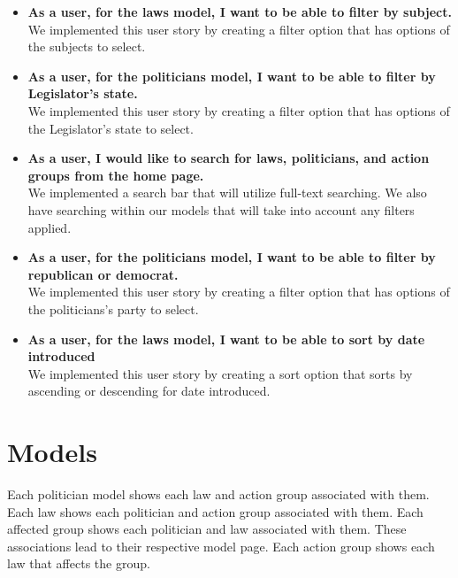 \documentclass[12pt]{article}
\begin{document}
\begin{itemize}
	\item\textbf{As a user, for the laws model, I want to be able to filter by subject.} \\
	We implemented this user story by creating a filter option that has options of the subjects to select.
	\\
	\item\textbf{As a user, for the politicians model, I want to be able to filter by Legislator's state.} \\
	We implemented this user story by creating a filter option that has options of the Legislator's state to select.
	\\
	
	\item\textbf{As a user, I would like to search for laws, politicians, and action groups from the home page.} \\
	We implemented a search bar that will utilize full-text searching. We also have searching within our models that will take into account any filters applied.
	\\
	
	\item\textbf{As a user, for the politicians model, I want to be able to filter by republican or democrat.} \\
	We implemented this user story by creating a filter option that has options of the politicians's party to select.
	\\
	
	\item\textbf{As a user, for the laws model, I want to be able to sort by date introduced} \\
	We implemented this user story by creating a sort option that sorts by ascending or descending for date introduced.
	\\
\end{itemize}

\section{Models}
    Each politician model shows each law and action group associated with them. Each law shows each politician and action group associated with them. Each affected group shows each politician and law associated with them. These associations lead to their respective model page. Each action group shows each law that affects the group. \\
\end{document}
